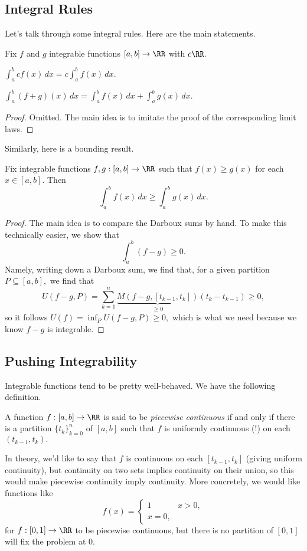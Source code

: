 \subsection{Integral Rules}
Let's talk through some integral rules. Here are the main statements.
\begin{proposition}
	Fix $f$ and $g$ integrable functions $[a,b]\to\RR$ with $c\RR.$
	\begin{listalph}
		\item $\int_a^bcf(x)\,dx=c\int_a^bf(x)\,dx.$
		\item $\int_a^b(f+g)(x)\,dx=\int_a^bf(x)\,dx+\int_a^bg(x)\,dx.$
	\end{listalph}
\end{proposition}
\begin{proof}
	Omitted. The main idea is to imitate the proof of the corresponding limit laws.
\end{proof}
Similarly, here is a bounding result.
\begin{proposition}
	Fix integrable functions $f,g:[a,b]\to\RR$ such that $f(x)\ge g(x)$ for each $x\in[a,b].$ Then
	\[\int_a^bf(x)\,dx\ge\int_a^bg(x)\,dx.\]
\end{proposition}
\begin{proof}
	The main idea is to compare the Darboux sums by hand. To make this technically easier, we show that
	\[\int_a^b(f-g)\ge0.\]
	Namely, writing down a Darboux sum, we find that, for a given partition $P\subseteq[a,b],$ we find that
	\[U(f-g,P)=\sum_{k=1}^n\underbrace{M(f-g,[t_{k-1},t_k])}_{\ge0}(t_k-t_{k-1})\ge0,\]
	so it follows $U(f)=\inf_PU(f-g,P)\ge0,$ which is what we need because we know $f-g$ is integrable.
\end{proof}

\subsection{Pushing Integrability}
Integrable functions tend to be pretty well-behaved. We have the following definition.
\begin{definition}
	A function $f:[a,b]\to\RR$ is said to be \textit{piecewise continuous} if and only if there is a partition $\{t_k\}_{k=0}^n$ of $[a,b]$ such that $f$ is uniformly continuous (!) on each $(t_{k-1},t_k).$
\end{definition}
In theory, we'd like to say that $f$ is continuous on each $[t_{k-1},t_k]$ (giving uniform continuity), but continuity on two sets implies continuity on their union, so this would make piecewise continuity imply continuity. More concretely, we would like functions like
\[f(x)=\begin{cases}
	1 & x > 0, \\
	x = 0,
\end{cases}\]
for $f:[0,1]\to\RR$ to be piecewise continuous, but there is no partition of $[0,1]$ will fix the problem at $0.$

